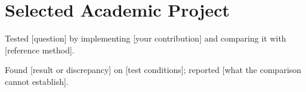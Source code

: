\documentclass{resume}
\begin{document}


\section{Selected Academic Project}

\begin{jobduties}
  \item Tested [question] by implementing [your contribution] and comparing it with [reference method].
  \item Found [result or discrepancy] on [test conditions]; reported [what the comparison cannot establish].
\end{jobduties}

\end{document}
